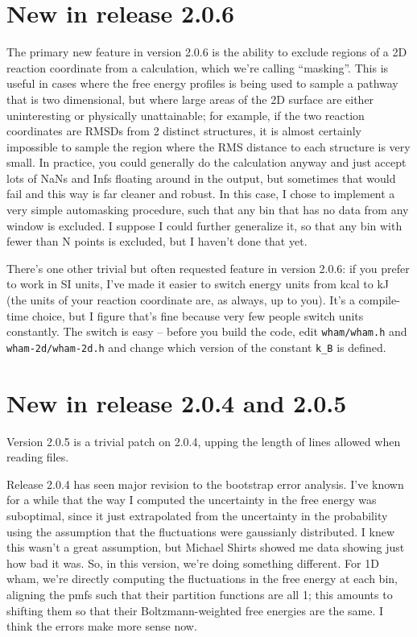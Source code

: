 \documentclass[12pt]{article}
\begin{document}
\section{New in release 2.0.6}

The primary new feature in version 2.0.6 is the ability to exclude regions of a
2D reaction coordinate from a calculation, which we're calling ``masking''.
This is useful in cases where the free energy profiles is being used to sample a
pathway that is two dimensional, but where large areas of the 2D surface are
either uninteresting or physically unattainable; for example, if the two
reaction coordinates are RMSDs from 2 distinct structures, it is almost
certainly impossible to sample the region where the RMS distance to each
structure is very small.  In practice, you could generally do the calculation
anyway and just accept lots of NaNs and Infs floating around in the output, but
sometimes that would fail and this way is far cleaner and robust.  In this case,
I chose to implement a very simple automasking procedure, such that any bin that
has no data from any window is excluded.  I suppose I could further generalize
it, so that any bin with fewer than N points is excluded, but I haven't done
that yet.

There's one other trivial but often requested feature in version 2.0.6: if
you prefer to work in SI units, I've made it easier to switch energy units
from kcal to kJ (the units of your reaction coordinate are, as always, up to
you).  It's a compile-time choice, but I figure that's fine because very few
people switch units constantly.  The switch is easy -- before you build the
code, edit {\tt wham/wham.h} and {\tt wham-2d/wham-2d.h} and change which
version of the constant {\tt k\_B} is defined.

\section{New in release 2.0.4 and 2.0.5}

Version 2.0.5 is a trivial patch on 2.0.4, upping the length of lines allowed
when reading files.

Release 2.0.4 has seen major revision to the bootstrap error analysis.  I've
known for a while that the way I computed the uncertainty in the free energy was
suboptimal, since it just extrapolated from the uncertainty in the probability
using the assumption that the fluctuations were gaussianly distributed.  I knew
this wasn't a great assumption, but Michael Shirts showed me data showing just
how bad it was.  So, in this version, we're doing something different.  For 1D
wham, we're directly computing the fluctuations in the free energy at each bin,
aligning the pmfs such that their partition functions are all 1; this amounts to
shifting them so that their Boltzmann-weighted free energies are the same.  I
think the errors make more sense now.
\end{document}
